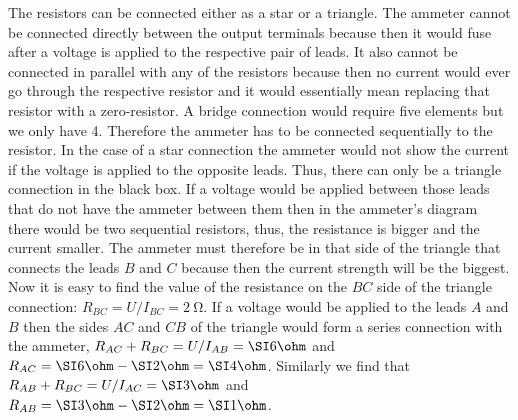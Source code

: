 \documentclass[11pt]{article}
\begin{document}

\solueng
The resistors can be connected either as a star or a triangle. The ammeter cannot be connected directly between the output terminals because then it would fuse after a voltage is applied to the respective pair of leads. It also cannot be connected in parallel with any of the resistors because then no current would ever go through the respective resistor and it would essentially mean replacing that resistor with a zero-resistor. A bridge connection would require five elements but we only have 4. Therefore the ammeter has to be connected sequentially to the resistor. In the case of a star connection the ammeter would not show the current if the voltage is applied to the opposite leads. Thus, there can only be a triangle connection in the black box. If a voltage would be applied between those leads that do not have the ammeter between them then in the ammeter’s diagram there would be two sequential resistors, thus, the resistance is bigger and the current smaller. The ammeter must therefore be in that side of the triangle that connects the leads $B$ and $C$ because then the current strength will be the biggest. Now it is easy to find the value of the resistance on the $BC$ side of the triangle connection: $R_{BC}=U/I_{BC}=\SI{2}{\ohm}$. If a voltage would be applied to the leads $A$ and $B$ then the sides $AC$ and $CB$ of the triangle would form a series connection with the ammeter, $R_{AC}+R_{BC}=U/I_{AB}=\SI 6\ohm$ and $R_{AC}=\SI 6\ohm-\SI 2\ohm=\SI 4\ohm$. Similarly we find that $R_{AB}+R_{BC}=U/I_{AC}=\SI 3\ohm$ and $R_{AB}=\SI 3\ohm-\SI 2\ohm=\SI 1\ohm$.
\probend
\bigskip

\end{document}
